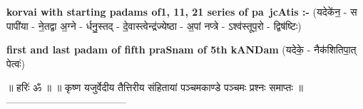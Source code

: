 \documentclass[17pt]{extarticle}
\begin{document}
        \textbf{korvai with starting padams of1, 11, 21 series of pa~jcAtis :-} \newline
        (यदेके॑न॒ - स पापी॑या - ने॒तद्वा अ॒ग्ने - र्धनु॒स्तद् - दे॒वास्त्वेन्द्र॑ज्येष्ठा - अ॒पां नप्त्रे - ऽश्व॑स्तूप॒रो - द्विष॑ष्टिः) \newline

        \textbf{first and last padam of fifth praSnam of 5th kANDam} \newline
        (यदेके॒ - नैक॑शितिपा॒त् पेत्वः॑) \newline 

        
        ॥ हरिः॑ ॐ ॥
॥ कृष्ण यजुर्वेदीय तैत्तिरीय संहितायां पञ्चमकाण्डे पञ्चमः प्रश्नः समाप्तः ॥
------------------------------------ \newline
        \pagebreak
                \pagebreak
        
\end{document}
